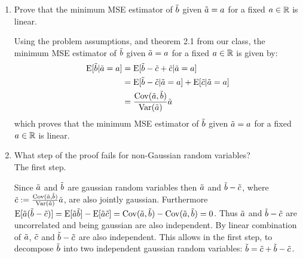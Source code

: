 \documentclass[12pt,twoside]{article}
\begin{document}
\begin{enumerate}
\begin{enumerate}
  \item Prove that the minimum MSE estimator of $\tilde{ b }$ given $\tilde{  a }=a$ for a fixed $a \in \mathbb{R}$ is linear. 
  
  Using the problem assumptions, and theorem 2.1 from our class, the minimum MSE estimator of $\tilde{ b }$ given $\tilde{  a }=a$ for a fixed $a \in \mathbb{R}$ is given by:
  \begin{align*}
  	\E[\rb | \ra = a]		&=	\E[\rb-  \rnd{c} +  \rnd{c} | \ra= a]	\\
					&=	\E[\rb-  \rnd{c} | \ra= a] + \E[\rnd{c} | \ra= a] \\
					&=	\frac{\cov(\ra,\rb)}{\var(\ra)} \ra
  \end{align*}
  which proves that the  minimum MSE estimator of $\tilde{ b }$ given $\tilde{  a }=a$ for a fixed $a \in \mathbb{R}$ is linear.
  
  \item What step of the proof fails for non-Gaussian random variables?\\
  The first step.
  
  Since $\tilde{  a }$ and $\tilde{  b }$ are gaussian random variables then $\tilde{  a }$ and $\tilde{  b } -  \tilde{ c }$, where $\rnd{c} := \frac{\cov(\ra,\rb)}{\var(\ra)}\ra$, are also jointly gaussian.
  Furthermore $\E[\ra (\rb-  \rnd{c})] = \E[\ra \rb] - \E[\ra \rnd{c}] = \cov(\ra,\rb) - \cov(\ra,\rb) = 0$. Thus $\tilde{  a }$ and $\tilde{  b } - \tilde{ c }$ are uncorrelated and being gaussian are also independent.
  By linear combination of $\tilde{  a }$, $\tilde{ c } $ and $\tilde{  b } - \tilde{ c }$ are also independent.
  This allows in the first step, to decompose $\tilde{  b }$ into two independent gaussian random variables: $\tilde{  b } =\tilde{ c }  + \tilde{  b } -  \tilde{ c }$.
  
  \end{enumerate} 
  

\end{enumerate}
\end{document}
